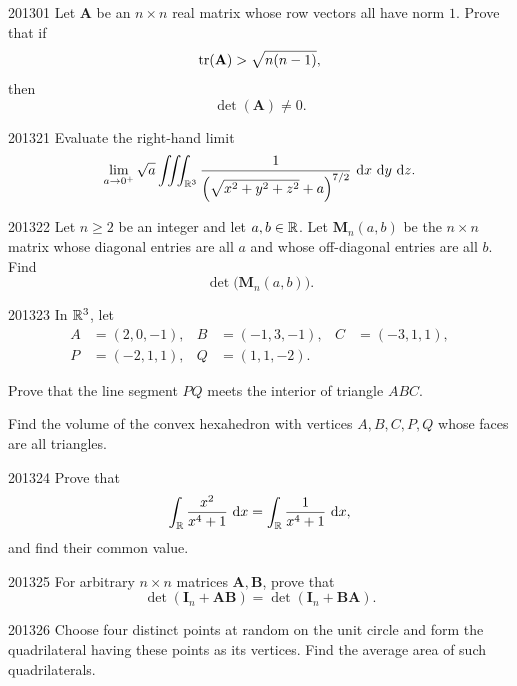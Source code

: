 
\begin{problem}{2013}{0}{1}
Let $\mathbf A$ be an $n\times n$ real matrix whose row vectors all have norm $1$. Prove that if
\[
    \operatorname{tr}(\mathbf A)>\sqrt{n(n-1)},
\]
then
\[
    \det(\mathbf A)\ne0.
\]
\end{problem}

\begin{problem}{2013}{2}{1}
Evaluate the right-hand limit
\[
    \lim_{a\to0^+}
    \sqrt a
    \iiint_{\mathbb{R}^3}
    \frac{1}{\left(\sqrt{x^2+y^2+z^2}+a\right)^{7/2}}
    \, \mathop{}\!\mathrm{d} x\, \mathop{}\!\mathrm{d} y\, \mathop{}\!\mathrm{d} z.
\]
\end{problem}

\begin{problem}{2013}{2}{2}
Let $n\ge2$ be an integer and let $a, b\in\mathbb{R}$. Let $\mathbf M_n(a, b)$ be the $n\times n$ matrix whose diagonal entries are all $a$ and whose off-diagonal entries are all $b$. Find
\[
    \det\bigl(\mathbf M_n(a, b)\bigr).
\]
\end{problem}

\begin{problem}{2013}{2}{3}
In $\mathbb{R}^3$, let
\[
\begin{aligned}
    A&=(2, 0, -1), &
    B&=(-1, 3, -1), &
    C&=(-3, 1, 1), \\
    P&=(-2, 1, 1), &
    Q&=(1, 1, -2).
\end{aligned}
\]
\begin{problemsubparts}
    \item Prove that the line segment $PQ$ meets the interior of triangle $ABC$.
    \item Find the volume of the convex hexahedron with vertices $A, B, C, P, Q$ whose faces are all triangles.
\end{problemsubparts}
\end{problem}

\begin{problem}{2013}{2}{4}
Prove that
\[
    \int_{\mathbb{R}}\frac{x^2}{x^4+1}\, \mathop{}\!\mathrm{d} x
    =
    \int_{\mathbb{R}}\frac{1}{x^4+1}\, \mathop{}\!\mathrm{d} x,
\]
and find their common value.
\end{problem}

\begin{problem}{2013}{2}{5}
For arbitrary $n\times n$ matrices $\mathbf A, \mathbf B$, prove that
\[
    \det(\mathbf I_n+\mathbf A\mathbf B)
    =
    \det(\mathbf I_n+\mathbf B\mathbf A).
\]
\end{problem}

\begin{problem}{2013}{2}{6}
Choose four distinct points at random on the unit circle and form the quadrilateral having these points as its vertices. Find the average area of such quadrilaterals.
\end{problem}

